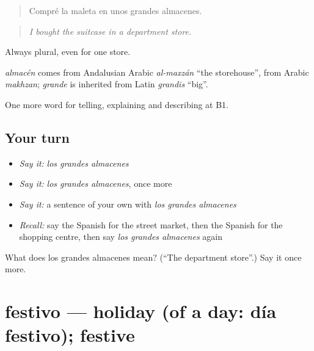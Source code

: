 \begin{quote}
Compré la maleta en unos grandes almacenes.
\end{quote}

\begin{quote}
\emph{I bought the suitcase in a department store.}
\end{quote}

Always plural, even for one store.

\begin{cousinweb}
\emph{almacén} comes from Andalusian Arabic \emph{al-maxzán} \textquotedblleft{}the storehouse\textquotedblright{}, from Arabic \emph{makhzan}; \emph{grande} is inherited from Latin \emph{grandis} \textquotedblleft{}big\textquotedblright{}.
\end{cousinweb}

\begin{grammarlens}[title={What you've built}]
One more word for telling, explaining and describing at B1.
\end{grammarlens}

\subsection*{Your turn}
\begin{itemize}
\raggedright
  \item \emph{Say it:} \emph{los grandes almacenes}
  \item \emph{Say it:} \emph{los grandes almacenes}, once more
  \item \emph{Say it:} a sentence of your own with \emph{los grandes almacenes}
  \item \emph{Recall:} say the Spanish for the street market, then the Spanish for the shopping centre, then say \emph{los grandes almacenes} again
\end{itemize}

\begin{tcolorbox}[breakable,colback=teal!4,colframe=teal!35!black,title={Before you move on}]
What does los grandes almacenes mean? (\textquotedblleft{}The department store\textquotedblright{}.) Say it once more.
\end{tcolorbox}
\section[festivo]{festivo — holiday (of a day: día festivo); festive}

\label{lesson:ES-C681-festivo}



